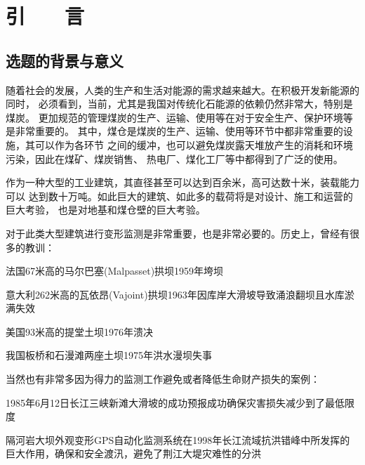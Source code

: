 
\chapter*{\hfill 引　　言 \hfill}
\label{chap00}

\section{选题的背景与意义}
随着社会的发展，人类的生产和生活对能源的需求越来越大。在积极开发新能源的同时，
必须看到，当前，尤其是我国对传统化石能源的依赖仍然非常大，特别是煤炭。
更加规范的管理煤炭的生产、运输、使用等在对于安全生产、保护环境等是非常重要的。
其中，煤仓是煤炭的生产、运输、使用等环节中都非常重要的设施，其可以作为各环节
之间的缓冲，也可以避免煤炭露天堆放产生的消耗和环境污染，因此在煤矿、煤炭销售、
热电厂、煤化工厂等中都得到了广泛的使用。

作为一种大型的工业建筑，其直径甚至可以达到百余米，高可达数十米，装载能力可以
达到数十万吨。如此巨大的建筑、如此多的载荷将是对设计、施工和运营的巨大考验，
也是对地基和煤仓壁的巨大考验。

对于此类大型建筑进行变形监测是非常重要，也是非常必要的。历史上，曾经有很多的教训\cite{DEFORM03}：
\begin{asparaitem}[$\bullet$]
\item 法国67米高的马尔巴塞(Malpasset)拱坝1959年垮坝
\item 意大利262米高的瓦依昂(Vajoint)拱坝1963年因库岸大滑坡导致涌浪翻坝且水库淤满失效
\item 美国93米高的提堂土坝1976年溃决
\item 我国板桥和石漫滩两座土坝1975年洪水漫坝失事
\end{asparaitem}
当然也有非常多因为得力的监测工作避免或者降低生命财产损失的案例\cite{DEFORM03}：
\begin{asparaitem}[$\bullet$]
\item 1985年6月12日长江三峡新滩大滑坡的成功预报成功确保灾害损失减少到了最低限度
\item 隔河岩大坝外观变形GPS自动化监测系统在1998年长江流域抗洪错峰中所发挥的巨大作用，确保和安全渡汛，避免了荆江大堤灾难性的分洪
\end{asparaitem}


